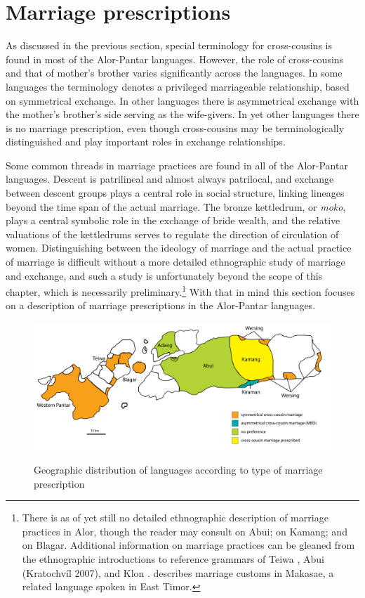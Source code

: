 \section{Marriage prescriptions}
As discussed in the previous section, special terminology for cross-cousins is found in most of the Alor-Pantar languages. However, the role of cross-cousins and that of mother's brother varies significantly across the languages. In some languages the terminology denotes a privileged marriageable relationship, based on symmetrical exchange. In other languages there is asymmetrical exchange with the mother's brother's side serving as the wife-givers. In yet other languages there is no marriage prescription, even though cross-cousins may be terminologically distinguished and  play important roles in exchange relationships. 

Some common threads in marriage practices are found in all of the Alor-Pantar languages. Descent is patrilineal and almost always patrilocal, and exchange between descent groups plays a central role in social structure, linking lineages beyond the time span of the actual marriage. The bronze kettledrum, or \textit{moko}, plays a central symbolic role in the exchange of bride wealth, and the relative valuations of the kettledrums serves to regulate the direction of circulation of women. Distinguishing between the ideology of marriage and the actual practice of marriage is difficult without a more detailed ethnographic study of marriage and exchange, and such a study is unfortunately beyond the scope of this chapter, which is necessarily preliminary.\footnote{{ }  There is as of yet still no detailed ethnographic description of marriage practices in Alor, though the reader may consult \citet{Nicolspeyer1940} on Abui; \citet{Stokhof1977} on Kamang; and \citet{Steinhauer2010} on Blagar. Additional information on marriage practices can be gleaned from the ethnographic introductions to reference grammars of Teiwa \citep{Klamer2010}, Abui (Kratochv\'il 2007), and Klon \citep{Baird2008}. \citet{Forman1980} describes marriage customs in Makasae, a related language spoken in East Timor.} With that in mind this section focuses on a description of marriage prescriptions in the Alor-Pantar languages. 

\begin{figure}\centering
\includegraphics[width=\textwidth]{figures/Holton_ch5_fig16.pdf}
\label{fig_marriage_systems}
\caption{Geographic distribution of languages according to type of marriage prescription}
\end{figure}

